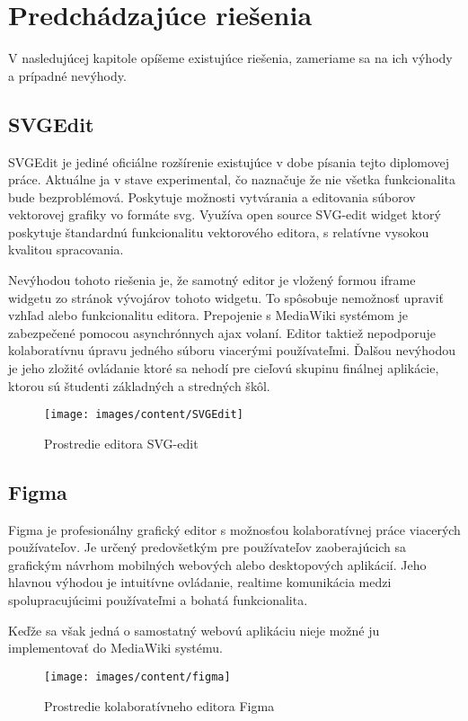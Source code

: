 \chapter{Predchádzajúce riešenia}\label{chap:previous_solutions}

V nasledujúcej kapitole opíšeme existujúce riešenia, zameriame sa na ich výhody a prípadné nevýhody.

\section{SVGEdit}

SVGEdit je jediné oficiálne rozšírenie existujúce v dobe písania tejto diplomovej práce. Aktuálne ja v stave experimental, čo naznačuje že nie všetka funkcionalita bude bezproblémová. Poskytuje možnosti vytvárania a editovania súborov vektorovej grafiky vo formáte svg. Využíva open source SVG-edit widget ktorý poskytuje štandardnú funkcionalitu vektorového editora, s relatívne vysokou kvalitou spracovania. 

Nevýhodou tohoto riešenia je, že samotný editor je vložený formou iframe widgetu zo stránok vývojárov tohoto widgetu. To spôsobuje nemožnosť upraviť vzhľad alebo funkcionalitu editora. Prepojenie s MediaWiki systémom je zabezpečené pomocou asynchrónnych ajax volaní. Editor taktiež nepodporuje kolaboratívnu úpravu jedného súboru viacerými používateľmi. Ďalšou nevýhodou je jeho zložité ovládanie ktoré sa nehodí pre cieľovú skupinu finálnej aplikácie, ktorou sú študenti základných a stredných škôl.

\begin{figure}[h]
	\centerline{\texttt{[image: images/content/SVGEdit]}}
	\caption[Editor SVG-edit]{Prostredie editora SVG-edit}
	\label{obr:SVGedit}
\end{figure}
\FloatBarrier


\section{Figma}

Figma je profesionálny grafický editor s možnosťou kolaboratívnej práce viacerých používateľov. Je určený predovšetkým pre používateľov zaoberajúcich sa grafickým návrhom mobilných webových alebo desktopových aplikácií. Jeho hlavnou výhodou je intuitívne ovládanie, realtime komunikácia medzi spolupracujúcimi používateľmi a bohatá funkcionalita. 

Keďže sa však jedná o samostatný webovú aplikáciu nieje možné ju implementovať do MediaWiki systému.

\begin{figure}[h]
	\centerline{\texttt{[image: images/content/figma]}}
	\caption[Editor Figma]{Prostredie kolaboratívneho editora Figma}
	\label{obr:Figma}
\end{figure}
\FloatBarrier